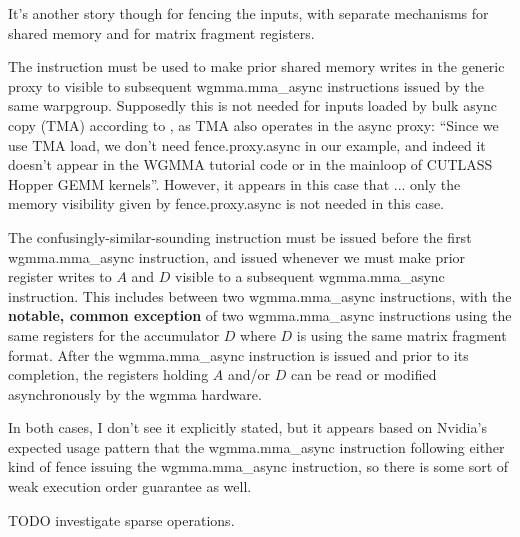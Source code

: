 \filbreak
It's another story though for fencing the inputs, with separate mechanisms for shared memory and for matrix fragment registers.

 The  instruction must be used to make prior shared memory writes in the generic proxy to visible to subsequent wgmma.mma\_async instructions issued by the same warpgroup.
Supposedly this is not needed for inputs loaded by bulk async copy (TMA) according to , as TMA also operates in the async proxy: ``Since we use TMA load, we don’t need fence.proxy.async in our example, and indeed it doesn’t appear in the WGMMA tutorial code or in the mainloop of CUTLASS Hopper GEMM kernels''.
However, it appears in this case that  ... only the memory visibility given by fence.proxy.async is not needed in this case.

\filbreak
{} The confusingly-similar-sounding  instruction must be issued before the first wgmma.mma\_async instruction, and issued whenever we must make prior register writes to $A$ and $D$ visible to a subsequent wgmma.mma\_async instruction. This includes between two wgmma.mma\_async instructions, with the \textbf{notable, common exception} of two wgmma.mma\_async instructions using the same registers for the accumulator $D$ where $D$ is using the same matrix fragment format. After the wgmma.mma\_async instruction is issued and prior to its completion, the registers holding $A$ and/or $D$ can be read or modified asynchronously by the wgmma hardware.

\filbreak
In both cases, I don't see it explicitly stated, but it appears based on Nvidia's expected usage pattern that the wgmma.mma\_async instruction following either kind of fence  issuing the wgmma.mma\_async instruction, so there is some sort of weak execution order guarantee as well.

TODO investigate sparse operations.

\filbreak
{}

